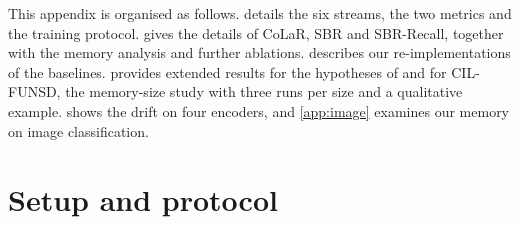 





\noindent This appendix is organised as follows.  details the six streams, the two metrics and the training protocol.  gives the details of CoLaR, SBR and SBR-Recall, together with the memory analysis and further ablations.  describes our re-implementations of the baselines.  provides extended results for the hypotheses of  and for CIL-FUNSD, the memory-size study with three runs per size and a qualitative example.  shows the drift on four encoders, and \cref{app:image} examines our memory on image classification.

\section{Setup and protocol}
\label{app:setup}
\begin{table}[t]
\centering\scriptsize
\setlength{\tabcolsep}{2.5pt}
\caption{\textbf{Benchmark settings}: six streams over five document datasets. Train/test documents: FUNSD 149/50, SROIE 626/347, CORD 800/100. DIL-XFUND: German, Spanish, French, Italian and Chinese. AA: mean F1 of the final model over the sessions; full-label F1: on the unmasked test set of the stream's dataset ().}
\label{tab:bench}

\end{table}

